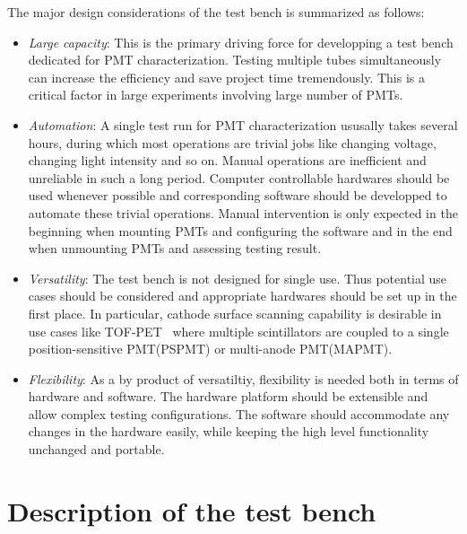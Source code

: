 \documentclass[5p, times]{elsarticle}
\begin{document}
The major design considerations of the test bench is summarized as follows:
\begin{itemize}
 \item \textit{Large capacity}: This is the primary driving force for developping a test bench dedicated for PMT characterization.
 Testing multiple tubes simultaneously can increase the efficiency and save project time tremendously.
 This is a critical factor in large experiments involving large number of PMTs.
 \item \textit{Automation}: A single test run for PMT characterization ususally takes several hours, during which most operations are trivial jobs like changing voltage, changing light intensity and so on.
 Manual operations are inefficient and unreliable in such a long period.
 Computer controllable hardwares should be used whenever possible and corresponding software should be developped to automate these trivial operations.
 Manual intervention is only expected in the beginning when mounting PMTs and configuring the software and in the end when unmounting PMTs and assessing testing result. 
 \item \textit{Versatility}: The test bench is not designed for single use.
 T\-h\-u\-s potential use cases should be considered and appropriate hardwares should be set up in the first place.
 In particular, cathode surface scanning capability is desirable in use cases like TOF-PET~\cite{tof_pet} where multiple scintillators are coupled to a single position-sensitive PMT(PSPMT) or multi-anode PMT(MAPMT). 
 \item \textit{Flexibility}: As a by product of versatiltiy, flexibility is needed both in terms of hardware and software.
 The hardware platform should be extensible and allow complex testing configurations.
 The software should accommodate any changes in the hardware easily, while keeping the high level functionality unchanged and portable. 
\end{itemize}


\section{Description of the test bench}
\label{sec:description}
\end{document}
